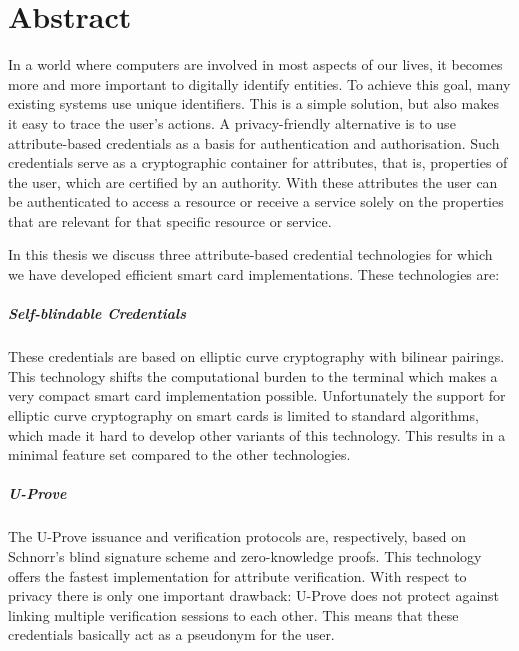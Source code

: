 \chapter*{Abstract}

In a world where computers are involved in most aspects of our lives, it
becomes more and more important to digitally identify entities. To achieve 
this goal, many existing systems use unique identifiers. This is a simple
solution, but also makes it easy to trace the user's actions. A 
privacy-friendly alternative is to use attribute-based credentials as a 
basis for authentication and authorisation. Such credentials serve as a 
cryptographic container for attributes, that is, properties of the user,
which are certified by an authority. With these attributes the user can 
be authenticated to access a resource or receive a service solely on the 
properties that are relevant for that specific resource or service.

In this thesis we discuss three attribute-based credential technologies 
for which we have developed efficient smart card implementations. These 
technologies are:

\paragraph{Self-blindable Credentials}
These credentials are based on elliptic curve cryptography with bilinear 
pairings. This technology shifts the computational burden to the terminal 
which makes a very compact smart card implementation possible. 
Unfortunately the support for elliptic curve cryptography on smart cards 
is limited to standard algorithms, which made it hard to develop other 
variants of this technology. This results in a minimal feature set 
compared to the other technologies.

\paragraph{U-Prove}
The U-Prove issuance and verification protocols are, respectively, based 
on Schnorr's blind signature scheme and zero-knowledge proofs. This 
technology offers the fastest implementation for attribute verification. 
With respect to privacy there is only one important drawback: U-Prove 
does not protect against linking multiple verification sessions to each 
other. This means that these credentials basically act as a pseudonym for 
the user.

